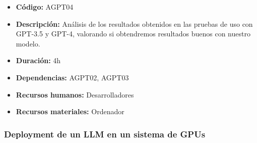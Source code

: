 \begin{itemize}
        \begin{itemize}
            \item \textbf{Código:} AGPT04
            \item \textbf{Descripción:} Análisis de los resultados obtenidos en las pruebas de uso con GPT-3.5 y GPT-4, 
                valorando si obtendremos resultados buenos con nuestro modelo.
            \item \textbf{Duración:} 4h
            \item \textbf{Dependencias:} AGPT02, AGPT03
            \item \textbf{Recursos humanos:} Desarrolladores
            \item \textbf{Recursos materiales:} Ordenador
        \end{itemize}
\end{itemize}

\subsubsection{Deployment de un LLM en un sistema de GPUs}
\label{subsubsec:tareas_gpu}


